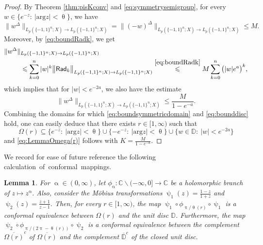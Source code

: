 \documentclass[11pt,reqno]{amsart}
\renewcommand{\leq}{\leqslant}
\renewcommand{\setminus}{\smallsetminus}
\renewcommand{\pi}{\uppi}
\newcommand{\1}{\mathbf 1}
\newtheorem{lemma}[theorem]{Lemma}
\theoremstyle{remark}
\renewcommand{\theta}{\uptheta}
\renewcommand{\alpha}{\upalpha}
\renewcommand{\psi}{\uppsi}
\renewcommand{\pi}{\uppi}
\renewcommand{\pi}{\uppi}
\newcommand{\mb}{\mathbb}
\newcommand{\msf}{\mathsf}
\begin{document}
\begin{proof}
By Theorem \ref{thm:pisKconv} and \eqref{eq:symmetrysemigroup}, for every $w\in\{e^{-z}: \ |\mathrm{arg}z|<\theta\}$, we have
\begin{equation} \label{eq:boundsymmetricdomain}
\|w^{\Delta}\|_{{L_p(\{-1,1\}^n;X)}\to {L_p(\{-1,1\}^n;X)}} = \|(-w)^{\Delta}\|_{{L_p(\{-1,1\}^n;X)}\to {L_p(\{-1,1\}^n;X)}} \leq M.
\end{equation}
Moreover, by \eqref{eq:boundRadk}, we get
\begin{equation}
\begin{split}
\|w^{\Delta}\|&_{{L_p(\{-1,1\}^n;X)}\to {L_p(\{-1,1\}^n;X)}} \\ & \leq \sum_{k=0}^n |w|^k \big\|\msf{Rad}_k\big\|_{{L_p(\{-1,1\}^n;X)}\to {L_p(\{-1,1\}^n;X)}}
 \stackrel{\eqref{eq:boundRadk}}{\leq} M \sum_{k=0}^n \big(|w|e^a\big)^k,
\end{split}
\end{equation}
which implies that for $|w|<e^{-2a}$, we also have the estimate
\begin{equation} \label{eq:bounddisc}
\|w^{\Delta}\|_{{L_p(\{-1,1\}^n;X)}\to {L_p(\{-1,1\}^n;X)}} \leq \frac{M}{1-e^{-a}}.
\end{equation}
Combining the domains for which \eqref{eq:boundsymmetricdomain} and \eqref{eq:bounddisc} hold, one can easily deduce that there exists $r\in[1,\infty)$ such that
\begin{equation}
\Omega(r) \subseteq \{e^{-z}: \ |\mathrm{arg}z|<\theta\} \cup \{-e^{-z}: \ |\mathrm{arg}z|<\theta\} \cup\{w\in\mb{D}: \ |w|<e^{-2a}\}
\end{equation}
and \eqref{eq:LemmaOmega(r)} follows with $K=\frac{M}{1-e^{-a}}$.
\end{proof}

We record for ease of future reference the following \mbox{calculation of conformal mappings.}

\begin{lemma} \label{lem:computeconformal}
For $\alpha\in(0,\infty)$, let $\phi_\alpha:\mb{C}\setminus(-\infty,0]\to\mb{C}$ be a holomorphic branch of $z\mapsto z^{\alpha}$. Also, consider the M\"obius transformations $\psi_1(z) = \frac{1-z}{1+z}$ and $\psi_2(z)=\frac{z+1}{z-1}$. Then, for every $r\in[1,\infty)$, the map $\psi_1\circ \phi_{\pi/\theta(r)}\circ\psi_1$ is a conformal equivalence between $\Omega(r)$ and the unit disc $\mb{D}$. Furthermore, the map $\psi_2\circ\phi_{\pi/(2\pi-\theta(r))}\circ\psi_2$ is a conformal equivalence between the complement $\overline{\Omega(r)}^c$ of $\overline{\Omega(r)}$ and the complement $\overline{\mb{D}}^c$ of the closed unit disc.
\end{lemma}
\end{document}
